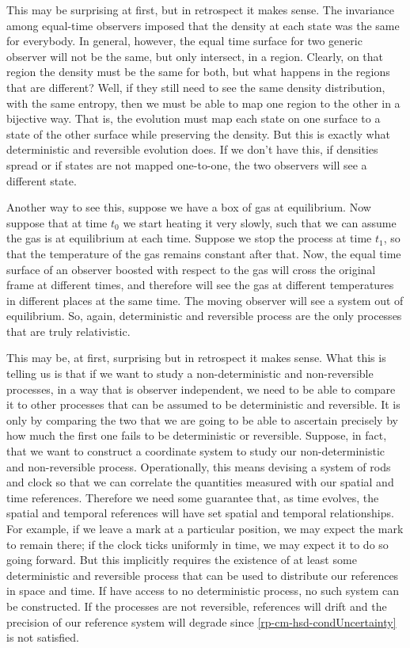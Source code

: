 This may be surprising at first, but in retrospect it makes sense. The invariance among equal-time observers imposed that the density at each state was the same for everybody. In general, however, the equal time surface for two generic observer will not be the same, but only intersect, in a region. Clearly, on that region the density must be the same for both, but what happens in the regions that are different? Well, if they still need to see the same density distribution, with the same entropy, then we must be able to map one region to the other in a bijective way. That is, the evolution must map each state on one surface to a state of the other surface while preserving the density. But this is exactly what deterministic and reversible evolution does. If we don't have this, if densities spread or if states are not mapped one-to-one, the two observers will see a different state.

Another way to see this, suppose we have a box of gas at equilibrium. Now suppose that at time $t_0$ we start heating it very slowly, such that we can assume the gas is at equilibrium at each time. Suppose we stop the process at time $t_1$, so that the temperature of the gas remains constant after that. Now, the equal time surface of an observer boosted with respect to the gas will cross the original frame at different times, and therefore will see the gas at different temperatures in different places at the same time. The moving observer will see a system out of equilibrium. So, again, deterministic and reversible process are the only processes that are truly relativistic.

This may be, at first, surprising but in retrospect it makes sense. What this is telling us is that if we want to study a non-deterministic and non-reversible processes, in a way that is observer independent, we need to be able to compare it to other processes that can be assumed to be deterministic and reversible. It is only by comparing the two that we are going to be able to ascertain precisely by how much the first one fails to be deterministic or reversible. Suppose, in fact, that we want to construct a coordinate system to study our non-deterministic and non-reversible process. Operationally, this means devising a system of rods and clock so that we can correlate the quantities measured with our spatial and time references. Therefore we need some guarantee that, as time evolves, the spatial and temporal references will have set spatial and temporal relationships. For example, if we leave a mark at a particular position, we may expect the mark to remain there; if the clock ticks uniformly in time, we may expect it to do so going forward. But this implicitly requires the existence of at least some deterministic and reversible process that can be used to distribute our references in space and time. If have access to no deterministic process, no such system can be constructed. If the processes are not reversible, references will drift and the precision of our reference system will degrade since \ref{rp-cm-hsd-condUncertainty} is not satisfied.

